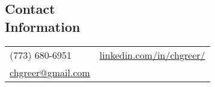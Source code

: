\documentclass[margin,line, 11pt]{res}
\begin{document}

\begin{resume}
\vspace*{-2mm}
\section{Contact\\Information}
\begin{tabular}{@{}p{4.9in}p{4in}}
  (773) 680-6951 & \href{https://www.linkedin.com/in/chgreer/}{linkedin.com/in/chgreer/} \\
  \href{mailto:chgreer@gmail.com}{chgreer@gmail.com}  \\
\end{tabular}



\end{resume}
\end{document}
